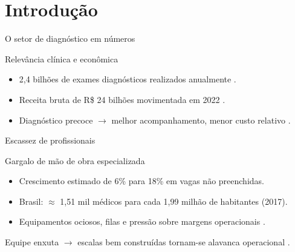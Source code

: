 \section{Introdução}


\begin{frame}{O setor de diagnóstico em números}

    \begin{block}{Relevância clínica e econômica}
        \begin{itemize}
            \item 2,4 bilhões de exames diagnósticos realizados anualmente \cite{MedicinaSA2024}.
            \item Receita bruta de R\$ 24 bilhões movimentada em 2022 \cite{Abramed_2023}.
            \item Diagnóstico precoce $\rightarrow$ melhor acompanhamento, menor custo relativo \cite{OBRIEN_2007,Yasui_Fujiwara_Okitsu_Yonemitsu_Ito_Yokosuka_2012}.
        \end{itemize}
    \end{block}

\end{frame}

\begin{frame}{Escassez de profissionais}

    \begingroup
    \begin{block}{Gargalo de mão de obra especializada \cite{Liebel_Dias_Schneider_SaScielo2021,RSNA_2024}}
        \begin{itemize}
            \item Crescimento estimado de 6\% para 18\% em vagas não preenchidas.
            \item Brasil: $\approx$ 1,51 mil médicos para cada 1,99 milhão de habitantes (2017).
            \item Equipamentos ociosos, filas e pressão sobre margens operacionais \cite{ANS_2024}.
        \end{itemize}
    \end{block}
    \endgroup

    \begin{block}{}
        Equipe enxuta $\rightarrow$ escalas bem construídas tornam-se alavanca operacional \cite{Rousseau_Pesant_Gendreau_2002,Robinson_Chen_2003}.
    \end{block}
\end{frame}

